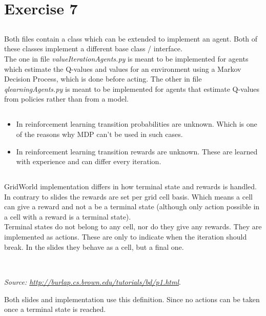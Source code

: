 \section{Exercise 7}
\subsection{}
Both files contain a class which can be extended to implement an agent. Both of these classes implement a different base class / interface. \\
The one in file \textit{valueIterationAgents.py} is meant to be implemented for agents which estimate the Q-values and values for an environment using a Markov Decision Process, which is done before acting.
The other in file \textit{qlearningAgents.py}  is meant to be implemented for agents that estimate Q-values from policies rather than from a model.

\subsection{}
\begin{itemize}
  \item In reinforcement learning transition probabilities are unknown. Which is one of the reasons why MDP can't be used in such cases.
  \item In reinforcement learning transition rewards are unknown. These are learned with experience and can differ every iteration.
\end{itemize}

\subsection{}
GridWorld implementation differs in how terminal state and rewards is handled. In contrary to slides the rewards are set per grid cell basis. Which means a cell can give a reward and not a be a terminal state (although only action possible in a cell with a reward is a terminal state). \\
Terminal states do not belong to any cell, nor do they give any rewards. They are implemented as actions. These are only to indicate when the iteration should break. In the slides they behave as a cell, but a final one.

\newpage{}
\subsection{}
\textit{}\\
\textit{Source: \url{http://burlap.cs.brown.edu/tutorials/bd/p1.html}}. \smallskip

Both slides and implementation use this definition. Since no actions can be taken once a terminal state is reached.
